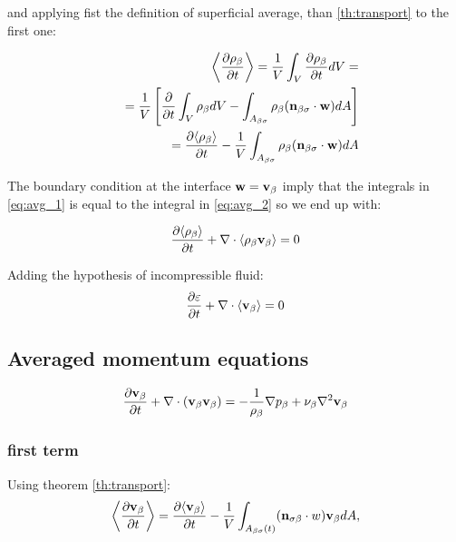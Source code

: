 and applying fist the definition of superficial average, than \ref{th:transport} to the first one:

\begin{eqnarray}
&&{\left< \dfrac{\partial \rho_{\beta}}{\partial t} \right>} = \dfrac{1}{V} \int_{V} \dfrac{\partial \rho_{\beta}}{\partial t} dV = \\
&& = \dfrac{1}{V} \left[  \dfrac{\partial}{\partial t} \int_{V} \rho_{\beta} dV -  \int_{A_{\beta \sigma}} \rho_{\beta} (\mathbf{n}_{\beta \sigma} \cdot \mathbf{w} ) dA   \right] \\
&& = \dfrac{\partial {\left< \rho_{\beta} \right>}}{\partial t} -\dfrac{1}{V}  \int_{A_{\beta \sigma}} \rho_{\beta} (\mathbf{n}_{\beta \sigma} \cdot \mathbf{w} ) dA 
\label{eq:avg_2}
\end{eqnarray}

The boundary condition at the interface $\mathbf{w} = \textbf{v}_{\beta}$ imply that the integrals in \ref{eq:avg_1} is equal to the integral in \ref{eq:avg_2} so we end up with:

\begin{equation}
\frac{\partial {\left< \rho_{\beta} \right>}}{\partial t} + \nabla \cdot {\left< \rho_{\beta}\textbf{v}_{\beta}\right>} = 0
\end{equation}

Adding the hypothesis of incompressible fluid:
\begin{equation}
\frac{\partial \varepsilon}{\partial t} + \nabla \cdot {\left< \textbf{v}_{\beta}\right>} = 0
\end{equation}



\subsection{Averaged momentum equations}


\begin{equation}
\dfrac{\partial \textbf{v}_{\beta}}{\partial t} + \nabla \cdot (\textbf{v}_{\beta}\textbf{v}_{\beta}) = -\frac{1}{\rho_{\beta}} \nabla p_{\beta} + \nu_{\beta} \nabla^2  \textbf{v}_{\beta}
\label{eq:mom}
\end{equation}

\subsubsection{first term}

Using theorem \ref{th:transport}:
\begin{equation}
{\left< \frac{\partial \textbf{v}_{\beta}}{\partial t} \right>} = \frac{\partial {\left< \textbf{v}_{\beta}\right>}}{\partial t} -\dfrac{1}{V} \int_{A_{\beta \sigma}(t)} (\mathbf{n}_{\sigma \beta} \cdot w) \textbf{v}_{\beta} dA,
\end{equation}

